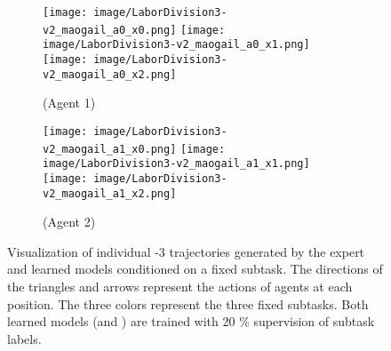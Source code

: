 \begin{figure*}[t]
\begin{subfigure}[t]{\subfwid\linewidth}
  \end{subfigure}
  \par\bigskip 
  \begin{subfigure}[t]{\subfwid\linewidth}
      \centering
      \texttt{[image: image/LaborDivision3-v2\_maogail\_a0\_x0.png]}\hspace{0.5ex}
      \texttt{[image: image/LaborDivision3-v2\_maogail\_a0\_x1.png]}\hspace{0.5ex}
      \texttt{[image: image/LaborDivision3-v2\_maogail\_a0\_x2.png]}
      \caption{\maogail (Agent 1)}
  \end{subfigure}
  \hspace{1ex}
  \begin{subfigure}[t]{\subfwid\linewidth}
      \centering
      \texttt{[image: image/LaborDivision3-v2\_maogail\_a1\_x0.png]}\hspace{0.5ex}
      \texttt{[image: image/LaborDivision3-v2\_maogail\_a1\_x1.png]}\hspace{0.5ex}
      \texttt{[image: image/LaborDivision3-v2\_maogail\_a1\_x2.png]}
      \caption{\maogail (Agent 2)}
  \end{subfigure}
  \captionsetup{subrefformat=parens}
  \caption{Visualization of individual \simplemulti-$3$ trajectories generated by the expert and learned models conditioned on a fixed subtask. The directions of the triangles and arrows represent the actions of agents at each position. The three colors represent the three fixed subtasks. Both learned models (\ouralg and \maogail) are trained with 20 \% supervision of subtask labels.}
  \label{fig: individual paths}
\end{figure*}

